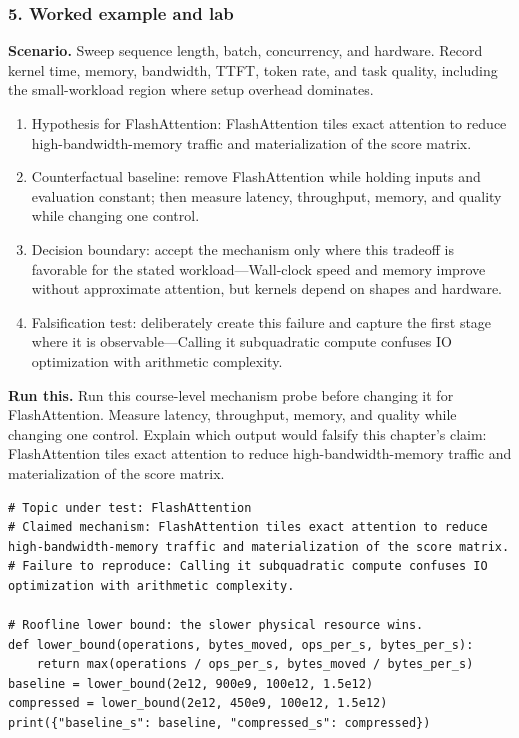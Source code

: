 \subsubsection*{5. Worked example and lab}
\textbf{Scenario.} Sweep sequence length, batch, concurrency, and hardware. Record kernel time, memory, bandwidth, TTFT, token rate, and task quality, including the small-workload region where setup overhead dominates.
\begin{enumerate}
\item Hypothesis for FlashAttention: FlashAttention tiles exact attention to reduce high-bandwidth-memory traffic and materialization of the score matrix.
\item Counterfactual baseline: remove FlashAttention while holding inputs and evaluation constant; then measure latency, throughput, memory, and quality while changing one control.
\item Decision boundary: accept the mechanism only where this tradeoff is favorable for the stated workload—Wall-clock speed and memory improve without approximate attention, but kernels depend on shapes and hardware.
\item Falsification test: deliberately create this failure and capture the first stage where it is observable—Calling it subquadratic compute confuses IO optimization with arithmetic complexity.
\end{enumerate}
\textbf{Run this.} Run this course-level mechanism probe before changing it for FlashAttention. Measure latency, throughput, memory, and quality while changing one control. Explain which output would falsify this chapter's claim: FlashAttention tiles exact attention to reduce high-bandwidth-memory traffic and materialization of the score matrix.
\begin{Verbatim}[fontsize=\scriptsize]
# Topic under test: FlashAttention
# Claimed mechanism: FlashAttention tiles exact attention to reduce high-bandwidth-memory traffic and materialization of the score matrix.
# Failure to reproduce: Calling it subquadratic compute confuses IO optimization with arithmetic complexity.

# Roofline lower bound: the slower physical resource wins.
def lower_bound(operations, bytes_moved, ops_per_s, bytes_per_s):
    return max(operations / ops_per_s, bytes_moved / bytes_per_s)
baseline = lower_bound(2e12, 900e9, 100e12, 1.5e12)
compressed = lower_bound(2e12, 450e9, 100e12, 1.5e12)
print({"baseline_s": baseline, "compressed_s": compressed})
\end{Verbatim}
